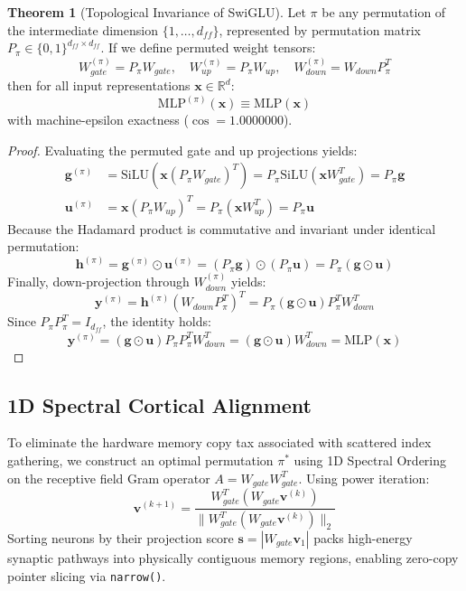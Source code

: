 \documentclass[10pt,journal,compsoc]{IEEEtran}
\theoremstyle{definition}
\newtheorem{theorem}{Theorem}
\begin{document}
\begin{theorem}[Topological Invariance of SwiGLU]
Let $\pi$ be any permutation of the intermediate dimension $\{1, \dots, d_{ff}\}$, represented by permutation matrix $P_\pi \in \{0, 1\}^{d_{ff} \times d_{ff}}$. If we define permuted weight tensors:
\begin{equation}
W_{gate}^{(\pi)} = P_\pi W_{gate}, \quad W_{up}^{(\pi)} = P_\pi W_{up}, \quad W_{down}^{(\pi)} = W_{down} P_\pi^T
\end{equation}
then for all input representations $\mathbf{x} \in \mathbb{R}^d$:
\begin{equation}
\text{MLP}^{(\pi)}(\mathbf{x}) \equiv \text{MLP}(\mathbf{x})
\end{equation}
with machine-epsilon exactness ($\cos = 1.0000000$).
\end{theorem}

\begin{proof}
Evaluating the permuted gate and up projections yields:
\begin{align}
\mathbf{g}^{(\pi)} &= \text{SiLU}(\mathbf{x} (P_\pi W_{gate})^T) = P_\pi \text{SiLU}(\mathbf{x} W_{gate}^T) = P_\pi \mathbf{g} \\
\mathbf{u}^{(\pi)} &= \mathbf{x} (P_\pi W_{up})^T = P_\pi (\mathbf{x} W_{up}^T) = P_\pi \mathbf{u}
\end{align}
Because the Hadamard product is commutative and invariant under identical permutation:
\begin{equation}
\mathbf{h}^{(\pi)} = \mathbf{g}^{(\pi)} \odot \mathbf{u}^{(\pi)} = (P_\pi \mathbf{g}) \odot (P_\pi \mathbf{u}) = P_\pi (\mathbf{g} \odot \mathbf{u})
\end{equation}
Finally, down-projection through $W_{down}^{(\pi)}$ yields:
\begin{equation}
\mathbf{y}^{(\pi)} = \mathbf{h}^{(\pi)} (W_{down} P_\pi^T)^T = P_\pi (\mathbf{g} \odot \mathbf{u}) P_\pi^T W_{down}^T
\end{equation}
Since $P_\pi P_\pi^T = I_{d_{ff}}$, the identity holds:
\begin{equation}
\mathbf{y}^{(\pi)} = (\mathbf{g} \odot \mathbf{u}) P_\pi P_\pi^T W_{down}^T = (\mathbf{g} \odot \mathbf{u}) W_{down}^T = \text{MLP}(\mathbf{x})
\end{equation}
\end{proof}

\subsection{1D Spectral Cortical Alignment}
To eliminate the hardware memory copy tax associated with scattered index gathering, we construct an optimal permutation $\pi^*$ using 1D Spectral Ordering on the receptive field Gram operator $A = W_{gate} W_{gate}^T$.
Using power iteration:
\begin{equation}
\mathbf{v}^{(k+1)} = \frac{W_{gate}^T (W_{gate} \mathbf{v}^{(k)})}{\|W_{gate}^T (W_{gate} \mathbf{v}^{(k)})\|_2}
\end{equation}
Sorting neurons by their projection score $\mathbf{s} = |W_{gate} \mathbf{v}_1|$ packs high-energy synaptic pathways into physically contiguous memory regions, enabling zero-copy pointer slicing via \texttt{narrow()}.
\end{document}
